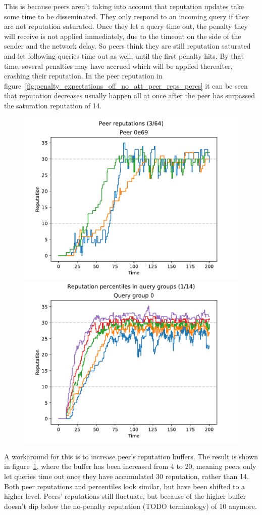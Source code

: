 This is because peers aren't taking into account that reputation updates take
some time to be disseminated. They only respond to an incoming query if they are
not reputation saturated. Once they let a query time out, the penalty they will
receive is not applied immediately, due to the timeout on the side of the sender
and the network delay. So peers think they are still reputation saturated and
let following queries time out as well, until the first penalty hits. By that
time, several penalties may have accrued which will be applied thereafter,
crashing their reputation. In the peer reputation in
figure~\ref{fig:penalty_expectations_off_no_att_peer_reps_percs} it can be seen
that reputation decreases usually happen all at once after the peer has
surpassed the saturation reputation of 14.

\begin{figure}[t]
\centering
\includegraphics[width=0.5\columnwidth]{figures/expectations_off_no_att_high_buf_peer_reps_3_of_64}%
\includegraphics[width=0.5\columnwidth]{figures/expectations_off_no_att_high_buf_rep_percs_1_of_14}
\label{fig:penalty_expectations_off_no_att_high_buf_peer_reps_percs}
\end{figure}

A workaround for this is to increase peer's reputation buffers. The result is
shown in
figure~\ref{fig:penalty_expectations_off_no_att_high_buf_peer_reps_percs}, where
the buffer has been increased from 4 to 20, meaning peers only let queries time
out once they have accumulated 30 reputation, rather than 14. Both peer
reputations and percentiles look similar, but have been shifted to a higher
level. Peers' reputations still fluctuate, but because of the higher buffer
doesn't dip below the no-penalty reputation (TODO terminology) of 10 anymore.

